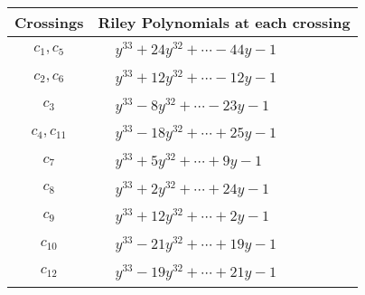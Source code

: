 \documentclass[1p]{elsarticle_modified}
\theoremstyle{definition}
\begin{document}
\begin{tabular}{m{50pt}|m{274pt}}
Crossings & \hspace{64pt}Riley Polynomials at each crossing \\
\hline $$\begin{aligned}c_{1},c_{5}\end{aligned}$$&$\begin{aligned}
&y^{33}+24 y^{32}+\cdots-44 y-1
\end{aligned}$\\
\hline $$\begin{aligned}c_{2},c_{6}\end{aligned}$$&$\begin{aligned}
&y^{33}+12 y^{32}+\cdots-12 y-1
\end{aligned}$\\
\hline $$\begin{aligned}c_{3}\end{aligned}$$&$\begin{aligned}
&y^{33}-8 y^{32}+\cdots-23 y-1
\end{aligned}$\\
\hline $$\begin{aligned}c_{4},c_{11}\end{aligned}$$&$\begin{aligned}
&y^{33}-18 y^{32}+\cdots+25 y-1
\end{aligned}$\\
\hline $$\begin{aligned}c_{7}\end{aligned}$$&$\begin{aligned}
&y^{33}+5 y^{32}+\cdots+9 y-1
\end{aligned}$\\
\hline $$\begin{aligned}c_{8}\end{aligned}$$&$\begin{aligned}
&y^{33}+2 y^{32}+\cdots+24 y-1
\end{aligned}$\\
\hline $$\begin{aligned}c_{9}\end{aligned}$$&$\begin{aligned}
&y^{33}+12 y^{32}+\cdots+2 y-1
\end{aligned}$\\
\hline $$\begin{aligned}c_{10}\end{aligned}$$&$\begin{aligned}
&y^{33}-21 y^{32}+\cdots+19 y-1
\end{aligned}$\\
\hline $$\begin{aligned}c_{12}\end{aligned}$$&$\begin{aligned}
&y^{33}-19 y^{32}+\cdots+21 y-1
\end{aligned}$\\
\hline
\end{tabular}\\~\\
\end{document}
